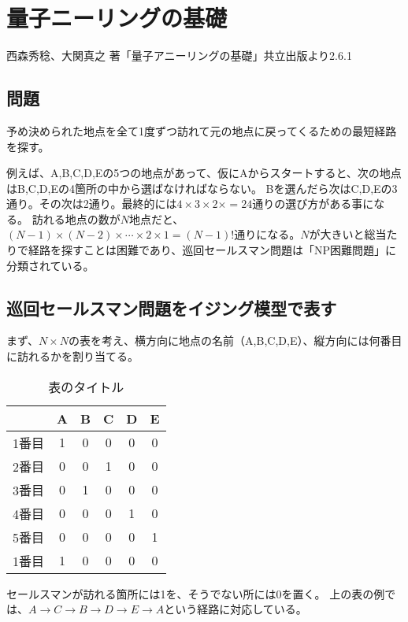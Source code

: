 \chapter{量子ニーリングの基礎}

\cite{b1} 西森秀稔、大関真之 著「量子アニーリングの基礎」共立出版より2.6.1

\section{問題}

予め決められた地点を全て1度ずつ訪れて元の地点に戻ってくるための最短経路を探す。

例えば、A,B,C,D,Eの5つの地点があって、仮にAからスタートすると、次の地点はB,C,D,Eの4箇所の中から選ばなければならない。
Bを選んだら次はC,D,Eの3通り。その次は2通り。最終的には$4\times 3\times 2\times = 24$通りの選び方がある事になる。
訪れる地点の数が$N$地点だと、$(N-1)\times(N-2)\times\cdots\times2\times1=(N-1)!$通りになる。$N$が大きいと総当たりで経路を探すことは困難であり、巡回セールスマン問題は「NP困難問題」に分類されている。

\section{巡回セールスマン問題をイジング模型で表す}

まず、$N\times N$の表を考え、横方向に地点の名前（A,B,C,D,E）、縦方向には何番目に訪れるかを割り当てる。

\begin{table}[h]
  \centering
  \caption{表のタイトル}
  \label{tab:hogehoge}
  \begin{tabular}{c|ccccc}
          & A & B & C & D & E \\\hline
    1番目  & 1 & 0 & 0 & 0 & 0 \\
    2番目  & 0 & 0 & 1 & 0 & 0 \\
    3番目  & 0 & 1 & 0 & 0 & 0 \\
    4番目  & 0 & 0 & 0 & 1 & 0 \\
    5番目  & 0 & 0 & 0 & 0 & 1 \\\hline
    1番目  & 1 & 0 & 0 & 0 & 0 \\
  \end{tabular}
\end{table}

セールスマンが訪れる箇所には1を、そうでない所には0を置く。
上の表の例では、$A\rightarrow C\rightarrow B\rightarrow D\rightarrow E\rightarrow A$という経路に対応している。

